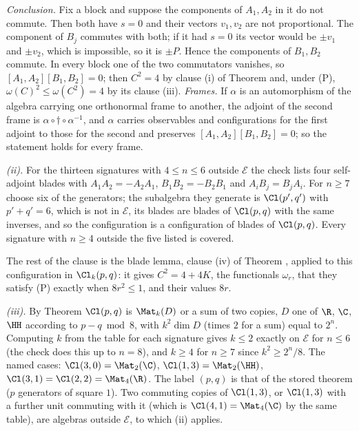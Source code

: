 \emph{Conclusion.} Fix a block and suppose the components of $A_{1}, A_{2}$ in it do not commute. Then both have $s = 0$ and their vectors $v_{1}, v_{2}$ are not proportional. The component of $B_{j}$ commutes with both; if it had $s = 0$ its vector would be $\pm v_{1}$ and $\pm v_{2}$, which is impossible, so it is $\pm P$. Hence the components of $B_{1}, B_{2}$ commute. In every block one of the two commutators vanishes, so $[A_{1},A_{2}][B_{1},B_{2}] = 0$; then $C^{2} = 4$ by clause (i) of Theorem  and, under (P), $\omega(C)^{2} \le \omega(C^{2}) = 4$ by its clause (iii). \emph{Frames.} If $\alpha$ is an automorphism of the algebra carrying one orthonormal frame to another, the adjoint of the second frame is $\alpha \circ \dagger \circ \alpha^{-1}$, and $\alpha$ carries observables and configurations for the first adjoint to those for the second and preserves $[A_{1},A_{2}][B_{1},B_{2}] = 0$; so the statement holds for every frame.

\emph{(ii).} For the thirteen signatures with $4 \le n \le 6$ outside $\mathcal{E}$ the check lists four self-adjoint blades with $A_{1}A_{2} = -A_{2}A_{1}$, $B_{1}B_{2} = -B_{2}B_{1}$ and $A_{i}B_{j} = B_{j}A_{i}$. For $n \ge 7$ choose six of the generators; the subalgebra they generate is $\Cl(p',q')$ with $p' + q' = 6$, which is not in $\mathcal{E}$, its blades are blades of $\Cl(p,q)$ with the same inverses, and so the configuration is a configuration of blades of $\Cl(p,q)$. Every signature with $n \ge 4$ outside the five listed is covered.

The rest of the clause is the blade lemma, clause (iv) of Theorem , applied to this configuration in $\Cl_{k}(p,q)$: it gives $C^{2} = 4 + 4K$, the functionals $\omega_{r}$, that they satisfy (P) exactly when $8r^{2} \le 1$, and their values $8r$.

\emph{(iii).} By Theorem  $\Cl(p,q)$ is $\Mat_{k}(D)$ or a sum of two copies, $D$ one of $\R$, $\C$, $\HH$ according to $p - q \bmod 8$, with $k^{2}\dim D$ (times $2$ for a sum) equal to $2^{n}$. Computing $k$ from the table for each signature gives $k \le 2$ exactly on $\mathcal{E}$ for $n \le 6$ (the check does this up to $n = 8$), and $k \ge 4$ for $n \ge 7$ since $k^{2} \ge 2^{n}/8$. The named cases: $\Cl(3,0) = \Mat_{2}(\C)$, $\Cl(1,3) = \Mat_{2}(\HH)$, $\Cl(3,1) = \Cl(2,2) = \Mat_{4}(\R)$. The label $(p,q)$ is that of the stored theorem ($p$ generators of square $1$). Two commuting copies of $\Cl(1,3)$, or $\Cl(1,3)$ with a further unit commuting with it (which is $\Cl(4,1) = \Mat_{4}(\C)$ by the same table), are algebras outside $\mathcal{E}$, to which (ii) applies.
